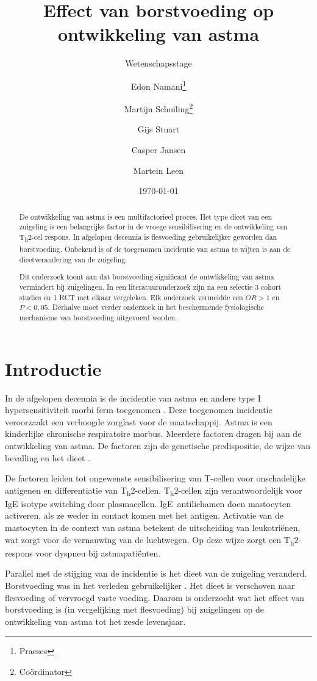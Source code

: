 \documentclass[table,abstract=true]{scrartcl}
\title{Effect van borstvoeding op ontwikkeling van astma}
\subtitle{Wetenschapsstage}
\author{Edon Namani\thanks{Praeses} \and Martijn Schuiling\thanks{Co\"ordinator} \and Gijs Stuart \and Casper Jansen \and Martein Leen}
\date{\today}
\begin{document}
\maketitle
    \begin{abstract}
        De ontwikkeling van astma is een multifactorieel proces. Het type dieet van een zuigeling is een belangrijke factor in de vroege sensibilisering en de ontwikkeling van T\textsubscript{h}2-cel respons. In afgelopen decennia is flesvoeding gebruikelijker geworden dan borstvoeding. Onbekend is of de toegenomen incidentie van astma te wijten is aan de dieetverandering van de zuigeling. 
        
        Dit onderzoek toont aan dat borstvoeding significant de ontwikkeling van astma vermindert bij zuigelingen. In een literatuuronderzoek zijn na een selectie 3 cohort studies en 1 RCT met elkaar vergeleken. Elk onderzoek vermeldde een $OR > 1$ en $P < 0,05$. Derhalve moet verder onderzoek in het beschermende fysiologische mechanisme van borstvoeding uitgevoerd worden.
    \end{abstract}

\section{Introductie}
In de afgelopen decennia is de incidentie van astma en andere type I hypersensitiviteit morbi ferm toegenomen \cite{Platts_Mills_2015}. Deze toegenomen incidentie veroorzaakt een verhoogde zorglast voor de maatschappij. Astma is een kinderlijke chronische respiratoire morbus. Meerdere factoren dragen bij aan de ontwikkeling van astma. De factoren zijn de genetische predispositie, de wijze van bevalling en het dieet \cite{abbas2017cellular,Houghteling_2015}.

De factoren leiden tot ongewenste sensibilisering van T-cellen voor onschadelijke antigenen en differentiatie van T\textsubscript{h}2-cellen. T\textsubscript{h}2-cellen zijn verantwoordelijk voor IgE isotype switching door plasmacellen. IgE~antilichamen doen mastocyten activeren, als ze weder in contact komen met het antigen. Activatie van de mastocyten in de context van astma betekent de uitscheiding van leukotriënen, wat zorgt voor de vernauwing van de luchtwegen. Op deze wijze zorgt een T\textsubscript{h}2-respons voor dyspneu bij astmapatiënten.

Parallel met de stijging van de incidentie is het dieet van de zuigeling veranderd. Borstvoeding was in het verleden gebruikelijker \cite{world1981contemporary,Victora_2016,Rollins_2016}. Het dieet is verschoven naar flesvoeding of vervroegd vaste voeding. Daarom is onderzocht wat het effect van borstvoeding is (in vergelijking met flesvoeding) bij zuigelingen op de ontwikkeling van astma tot het zesde levensjaar.
\end{document}
